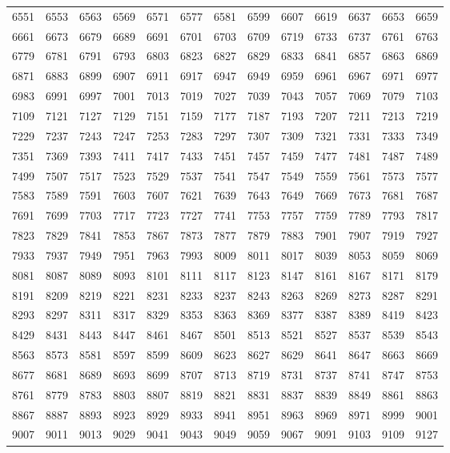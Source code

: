 \documentclass[12pt, a6paper]{extarticle}
\begin{document}
\begin{longtable}{lllll lllll lll}
6551 &6553 &6563 &6569 &6571 &6577 &6581 &6599 &6607 &6619 &6637 &6653 &6659 \\
6661 &6673 &6679 &6689 &6691 &6701 &6703 &6709 &6719 &6733 &6737 &6761 &6763 \\
6779 &6781 &6791 &6793 &6803 &6823 &6827 &6829 &6833 &6841 &6857 &6863 &6869 \\
6871 &6883 &6899 &6907 &6911 &6917 &6947 &6949 &6959 &6961 &6967 &6971 &6977 \\
6983 &6991 &6997 &7001 &7013 &7019 &7027 &7039 &7043 &7057 &7069 &7079 &7103 \\
7109 &7121 &7127 &7129 &7151 &7159 &7177 &7187 &7193 &7207 &7211 &7213 &7219 \\
7229 &7237 &7243 &7247 &7253 &7283 &7297 &7307 &7309 &7321 &7331 &7333 &7349 \\
7351 &7369 &7393 &7411 &7417 &7433 &7451 &7457 &7459 &7477 &7481 &7487 &7489 \\
7499 &7507 &7517 &7523 &7529 &7537 &7541 &7547 &7549 &7559 &7561 &7573 &7577 \\
7583 &7589 &7591 &7603 &7607 &7621 &7639 &7643 &7649 &7669 &7673 &7681 &7687 \\
7691 &7699 &7703 &7717 &7723 &7727 &7741 &7753 &7757 &7759 &7789 &7793 &7817 \\
7823 &7829 &7841 &7853 &7867 &7873 &7877 &7879 &7883 &7901 &7907 &7919 &7927 \\
7933 &7937 &7949 &7951 &7963 &7993 &8009 &8011 &8017 &8039 &8053 &8059 &8069 \\
8081 &8087 &8089 &8093 &8101 &8111 &8117 &8123 &8147 &8161 &8167 &8171 &8179 \\
8191 &8209 &8219 &8221 &8231 &8233 &8237 &8243 &8263 &8269 &8273 &8287 &8291 \\
8293 &8297 &8311 &8317 &8329 &8353 &8363 &8369 &8377 &8387 &8389 &8419 &8423 \\
8429 &8431 &8443 &8447 &8461 &8467 &8501 &8513 &8521 &8527 &8537 &8539 &8543 \\
8563 &8573 &8581 &8597 &8599 &8609 &8623 &8627 &8629 &8641 &8647 &8663 &8669 \\
8677 &8681 &8689 &8693 &8699 &8707 &8713 &8719 &8731 &8737 &8741 &8747 &8753 \\
8761 &8779 &8783 &8803 &8807 &8819 &8821 &8831 &8837 &8839 &8849 &8861 &8863 \\
8867 &8887 &8893 &8923 &8929 &8933 &8941 &8951 &8963 &8969 &8971 &8999 &9001 \\
9007 &9011 &9013 &9029 &9041 &9043 &9049 &9059 &9067 &9091 &9103 &9109 &9127 \\

\end{longtable}
\end{document}
